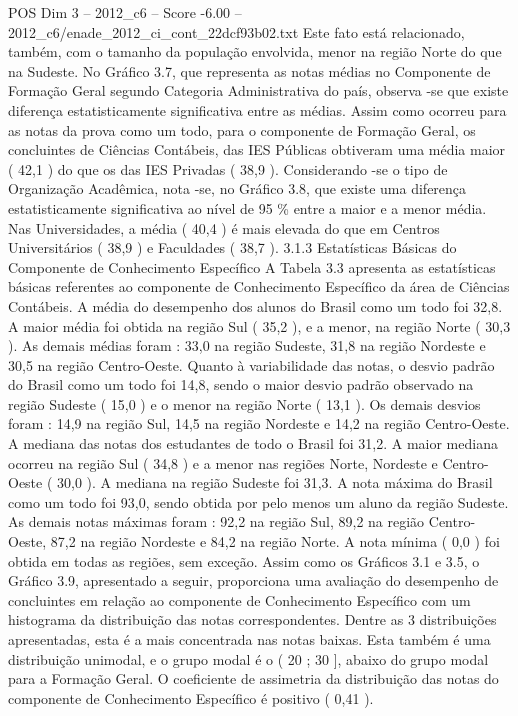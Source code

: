 \begin{textsample}{POS Dim 3 – 2012\_c6 – Score -6.00 – 2012\_c6/enade\_2012\_ci\_cont\_22dcf93b02.txt}
Este fato está relacionado, também, com o tamanho da população envolvida, menor na região Norte do que na Sudeste.
No Gráfico 3.7, que representa as notas médias no Componente de Formação Geral segundo Categoria Administrativa do país, observa -se que existe diferença estatisticamente significativa entre as médias.
Assim como ocorreu para as notas da prova como um todo, para o componente de Formação Geral, os concluintes de Ciências Contábeis, das IES Públicas obtiveram uma média maior ( 42,1 ) do que os das IES Privadas ( 38,9 ).
Considerando -se o tipo de Organização Acadêmica, nota -se, no Gráfico 3.8, que existe uma diferença estatisticamente significativa ao nível de 95 \% entre a maior e a menor média.
Nas Universidades, a média ( 40,4 ) é mais elevada do que em Centros Universitários ( 38,9 ) e Faculdades ( 38,7 ). 3.1.3 Estatísticas Básicas do Componente de Conhecimento Específico A Tabela 3.3 apresenta as estatísticas básicas referentes ao componente de Conhecimento Específico da área de Ciências Contábeis.
A média do desempenho dos alunos do Brasil como um todo foi 32,8.
A maior média foi obtida na região Sul ( 35,2 ), e a menor, na região Norte ( 30,3 ).
As demais médias foram : 33,0 na região Sudeste, 31,8 na região Nordeste e 30,5 na região Centro-Oeste.
Quanto à variabilidade das notas, o desvio padrão do Brasil como um todo foi 14,8, sendo o maior desvio padrão observado na região Sudeste ( 15,0 ) e o menor na região Norte ( 13,1 ).
Os demais desvios foram : 14,9 na região Sul, 14,5 na região Nordeste e 14,2 na região Centro-Oeste.
A mediana das notas dos estudantes de todo o Brasil foi 31,2.
A maior mediana ocorreu na região Sul ( 34,8 ) e a menor nas regiões Norte, Nordeste e Centro-Oeste ( 30,0 ).
A mediana na região Sudeste foi 31,3.
A nota máxima do Brasil como um todo foi 93,0, sendo obtida por pelo menos um aluno da região Sudeste.
As demais notas máximas foram : 92,2 na região Sul, 89,2 na região Centro-Oeste, 87,2 na região Nordeste e 84,2 na região Norte.
A nota mínima ( 0,0 ) foi obtida em todas as regiões, sem exceção.
Assim como os Gráficos 3.1 e 3.5, o Gráfico 3.9, apresentado a seguir, proporciona uma avaliação do desempenho de concluintes em relação ao componente de Conhecimento Específico com um histograma da distribuição das notas correspondentes.
Dentre as 3 distribuições apresentadas, esta é a mais concentrada nas notas baixas.
Esta também é uma distribuição unimodal, e o grupo modal é o ( 20 ; 30 ], abaixo do grupo modal para a Formação Geral.
O coeficiente de assimetria da distribuição das notas do componente de Conhecimento Específico é positivo ( 0,41 ).

\end{textsample}
